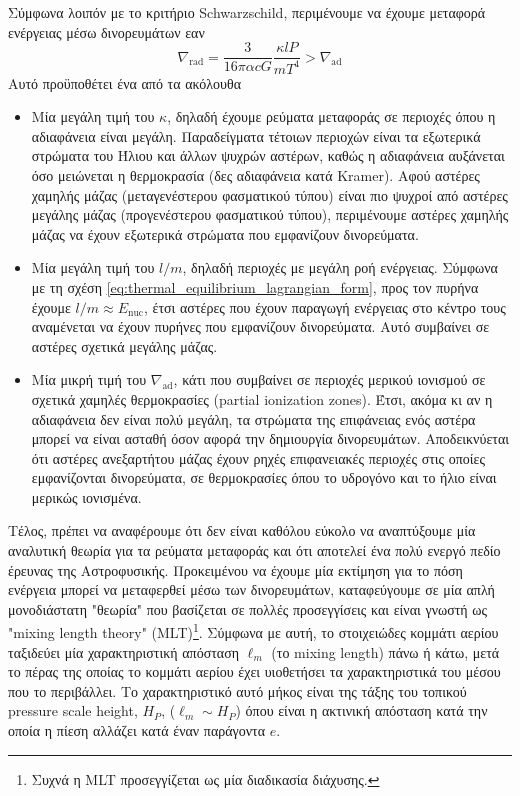 Σύμφωνα λοιπόν με το κριτήριο Schwarzschild, περιμένουμε να έχουμε μεταφορά ενέργειας μέσω δινορευμάτων εαν
\begin{equation*}
    \nabla_{\text{rad}} = \frac{3}{16\pi \alpha c G} \frac{\kappa l P}{m T^4} > \nabla_{\text{ad}}
\end{equation*}
Αυτό προϋποθέτει ένα από τα ακόλουθα
\begin{itemize}
    \item Μία μεγάλη τιμή του $\kappa$, δηλαδή έχουμε ρεύματα μεταφοράς σε περιοχές όπου η αδιαφάνεια είναι μεγάλη. Παραδείγματα τέτοιων περιοχών είναι τα εξωτερικά στρώματα του Ήλιου και άλλων ψυχρών αστέρων, καθώς η αδιαφάνεια αυξάνεται όσο μειώνεται η θερμοκρασία (δες αδιαφάνεια κατά Kramer). Αφού αστέρες χαμηλής μάζας (μεταγενέστερου φασματικού τύπου) είναι πιο ψυχροί από αστέρες μεγάλης μάζας (προγενέστερου φασματικού τύπου), περιμένουμε αστέρες χαμηλής μάζας να έχουν εξωτερικά στρώματα που εμφανίζουν δινορεύματα.
    
    \item Μία μεγάλη τιμή του $l/m$, δηλαδή περιοχές με μεγάλη ροή ενέργειας. Σύμφωνα με τη σχέση \eqref{eq:thermal_equilibrium_lagrangian_form}, προς τον πυρήνα έχουμε $l/m \approx E_{\text{nuc}}$, έτσι αστέρες που έχουν παραγωγή ενέργειας στο κέντρο τους αναμένεται να έχουν πυρήνες που εμφανίζουν δινορεύματα. Αυτό συμβαίνει σε αστέρες σχετικά μεγάλης μάζας. 
    
    \item Μία μικρή τιμή του $\nabla_{\text{ad}}$, κάτι που συμβαίνει σε περιοχές μερικού ιονισμού σε σχετικά χαμηλές θερμοκρασίες (partial ionization zones). Έτσι, ακόμα κι αν η αδιαφάνεια δεν είναι πολύ μεγάλη, τα στρώματα της επιφάνειας ενός αστέρα μπορεί να είναι ασταθή όσον αφορά την δημιουργία δινορευμάτων. Αποδεικνύεται ότι αστέρες ανεξαρτήτου μάζας έχουν ρηχές επιφανειακές περιοχές στις οποίες εμφανίζονται δινορεύματα, σε θερμοκρασίες όπου το υδρογόνο και το ήλιο είναι μερικώς ιονισμένα. 
\end{itemize}

Τέλος, πρέπει να αναφέρουμε ότι δεν είναι καθόλου εύκολο να αναπτύξουμε μία αναλυτική θεωρία για τα ρεύματα μεταφοράς και ότι αποτελεί ένα πολύ ενεργό πεδίο έρευνας της Αστροφυσικής. Προκειμένου να έχουμε μία εκτίμηση για το πόση ενέργεια μπορεί να μεταφερθεί μέσω των δινορευμάτων, καταφεύγουμε σε μία απλή μονοδιάστατη "θεωρία" που βασίζεται σε πολλές προσεγγίσεις και είναι γνωστή ως "mixing length theory" (MLT)\footnote{Συχνά η MLT προσεγγίζεται ως μία διαδικασία διάχυσης.}. Σύμφωνα με αυτή, το στοιχειώδες κομμάτι αερίου ταξιδεύει μία χαρακτηριστική απόσταση $\ell_m$ (το mixing length) πάνω ή κάτω, μετά το πέρας της οποίας το κομμάτι αερίου έχει υιοθετήσει τα χαρακτηριστικά του μέσου που το περιβάλλει. Το χαρακτηριστικό αυτό μήκος είναι της τάξης του τοπικού pressure scale height, $H_P$, ($\ell_m \sim H_P$) όπου είναι η ακτινική απόσταση κατά την οποία η πίεση αλλάζει κατά έναν παράγοντα $e$.

